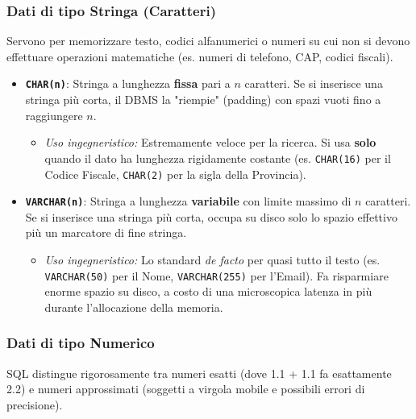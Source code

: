 \subsubsection*{Dati di tipo Stringa (Caratteri)}
Servono per memorizzare testo, codici alfanumerici o numeri su cui non si devono effettuare operazioni matematiche (es. numeri di telefono, CAP, codici fiscali).

\begin{itemize}
    \item \texttt{\textbf{CHAR(n)}}: Stringa a lunghezza \textbf{fissa} pari a $n$ caratteri. Se si inserisce una stringa più corta, il DBMS la "riempie" (padding) con spazi vuoti fino a raggiungere $n$.
    \begin{itemize}
        \item \textit{Uso ingegneristico:} Estremamente veloce per la ricerca. Si usa \textbf{solo} quando il dato ha lunghezza rigidamente costante (es. \texttt{CHAR(16)} per il Codice Fiscale, \texttt{CHAR(2)} per la sigla della Provincia).
    \end{itemize}
    
    \item \texttt{\textbf{VARCHAR(n)}}: Stringa a lunghezza \textbf{variabile} con limite massimo di $n$ caratteri. Se si inserisce una stringa più corta, occupa su disco solo lo spazio effettivo più un marcatore di fine stringa.
    \begin{itemize}
        \item \textit{Uso ingegneristico:} Lo standard \textit{de facto} per quasi tutto il testo (es. \texttt{VARCHAR(50)} per il Nome, \texttt{VARCHAR(255)} per l'Email). Fa risparmiare enorme spazio su disco, a costo di una microscopica latenza in più durante l'allocazione della memoria.
    \end{itemize}
\end{itemize}

\subsubsection*{Dati di tipo Numerico}
SQL distingue rigorosamente tra numeri esatti (dove 1.1 + 1.1 fa esattamente 2.2) e numeri approssimati (soggetti a virgola mobile e possibili errori di precisione).

